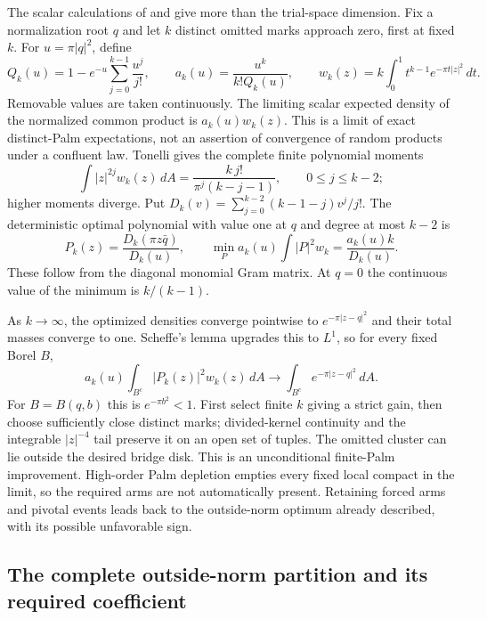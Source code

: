 \documentclass[11pt,a4paper]{article}
\theoremstyle{definition}
\theoremstyle{remark}
\numberwithin{equation}{section}
\begin{document}
The scalar calculations of 
and  give more than the
trial-space dimension. Fix a normalization root $q$ and let $k$
distinct omitted marks approach zero, first at fixed $k$.
For $u=\pi|q|^2$, define
\[
 Q_k(u)=1-e^{-u}\sum_{j=0}^{k-1}\frac{u^j}{j!},\qquad
 a_k(u)=\frac{u^k}{k!Q_k(u)},\qquad
 w_k(z)=k\int_0^1t^{k-1}e^{-\pi t|z|^2}\,dt .
\]
Removable values are taken continuously. The limiting scalar expected
density of the normalized common product is $a_k(u)w_k(z)$.
This is a limit of exact distinct-Palm expectations, not an assertion
of convergence of random products under a confluent law.
Tonelli gives the complete finite polynomial moments
\[
 \int |z|^{2j}w_k(z)\,dA
       =\frac{k\,j!}{\pi^j(k-j-1)},\qquad0\le j\le k-2;
\]
higher moments diverge. Put
$D_k(v)=\sum_{j=0}^{k-2}(k-1-j)v^j/j!$.
The deterministic optimal polynomial with value one at $q$ and
degree at most $k-2$ is
\[
 P_k(z)=\frac{D_k(\pi z\bar q)}{D_k(u)},\qquad
 \min_P a_k(u)\int|P|^2w_k=\frac{a_k(u)k}{D_k(u)}.
\]
These follow from the diagonal monomial Gram matrix. At $q=0$
the continuous value of the minimum is $k/(k-1)$.

As $k\to\infty$, the optimized densities converge pointwise to
$e^{-\pi|z-q|^2}$ and their total masses converge to one.
Scheffe's lemma upgrades this to $L^1$, so for every fixed Borel $B$,
\begin{equation}\label{br:confluent-gaussian}
 a_k(u)\int_{B^c}|P_k(z)|^2w_k(z)\,dA
        \longrightarrow\int_{B^c}e^{-\pi|z-q|^2}\,dA.
\end{equation}
For $B=B(q,b)$ this is $e^{-\pi b^2}<1$.
First select finite $k$ giving a strict gain, then choose sufficiently
close distinct marks; divided-kernel continuity and the integrable
$|z|^{-4}$ tail preserve it on an open set of tuples.
The omitted cluster can lie outside the desired bridge disk.
This is an unconditional finite-Palm improvement. High-order Palm
depletion empties every fixed local compact in the limit, so the
required arms are not automatically present. Retaining forced arms
and pivotal events leads back to the outside-norm optimum already
described, with its possible unfavorable sign.

\subsection{The complete outside-norm partition and its required coefficient}
\label{br:complete-partition}
\end{document}
